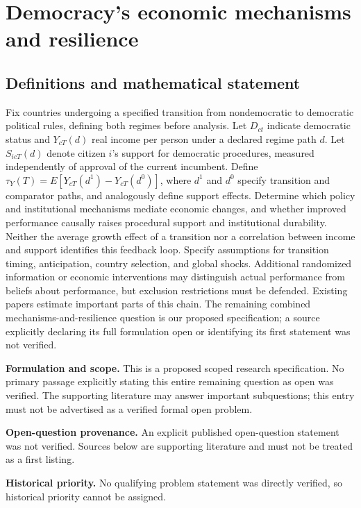 \documentclass[11pt]{article}
\begin{document}
\section*{Democracy's economic mechanisms and resilience}\label{30007670}
\subsection{Definitions and mathematical statement}
Fix countries undergoing a specified transition from nondemocratic to democratic political rules, defining both regimes before analysis. Let \(D_{ct}\) indicate democratic status and \(Y_{cT}(d)\) real income per person under a declared regime path \(d\). Let \(S_{icT}(d)\) denote citizen \(i\)'s support for democratic procedures, measured independently of approval of the current incumbent. Define \(\tau_Y(T)=E[Y_{cT}(d^1)-Y_{cT}(d^0)]\), where \(d^1\) and \(d^0\) specify transition and comparator paths, and analogously define support effects. Determine which policy and institutional mechanisms mediate economic changes, and whether improved performance causally raises procedural support and institutional durability. Neither the average growth effect of a transition nor a correlation between income and support identifies this feedback loop. Specify assumptions for transition timing, anticipation, country selection, and global shocks. Additional randomized information or economic interventions may distinguish actual performance from beliefs about performance, but exclusion restrictions must be defended. Existing papers estimate important parts of this chain. The remaining combined mechanisms-and-resilience question is our proposed specification; a source explicitly declaring its full formulation open or identifying its first statement was not verified.

\par\textbf{Formulation and scope.} This is a proposed scoped research specification. No primary passage explicitly stating this entire remaining question as open was verified. The supporting literature may answer important subquestions; this entry must not be advertised as a verified formal open problem.

\par\textbf{Open-question provenance.} An explicit published open-question statement was not verified. Sources below are supporting literature and must not be treated as a first listing.

\par\textbf{Historical priority.} No qualifying problem statement was directly verified, so historical priority cannot be assigned.
\end{document}
